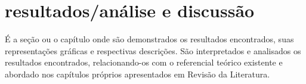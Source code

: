\section{resultados/análise e discussão}
É a seção ou o capítulo onde são demonstrados os resultados encontrados, suas representações gráficas e respectivas descrições. São interpretados e analisados os resultados encontrados, relacionando-os com o referencial teórico existente e abordado nos capítulos próprios apresentados em Revisão da Literatura.